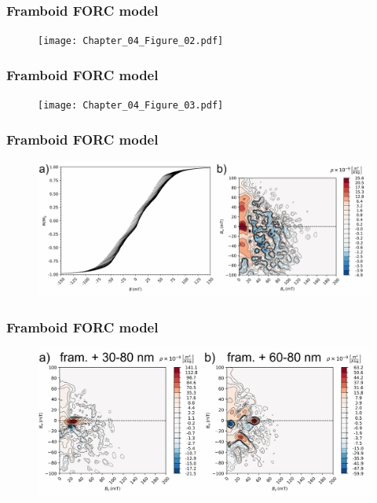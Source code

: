 \documentclass{beamer}
\begin{document}
        \begin{frame}
          \frametitle{Framboid FORC model}
          \begin{figure}[htb]
            \centering
            \texttt{[image: Chapter\_04\_Figure\_02.pdf]}
          \end{figure}
        \end{frame}

        \begin{frame}
          \frametitle{Framboid FORC model}
          \begin{figure}[htb]
            \centering
            \texttt{[image: Chapter\_04\_Figure\_03.pdf]}
          \end{figure}
        \end{frame}

        \begin{frame}
          \frametitle{Framboid FORC model}
          \begin{figure}[htb]
            \centering
            \includegraphics[width=\textwidth]{Chapter_04_Figure_04.pdf}
          \end{figure}
        \end{frame}

        \begin{frame}
          \frametitle{Framboid FORC model}
          \begin{figure}[htb]
            \centering
            \includegraphics[width=\textwidth]{Chapter_04_Figure_05.pdf}
          \end{figure}
        \end{frame}
\end{document}
